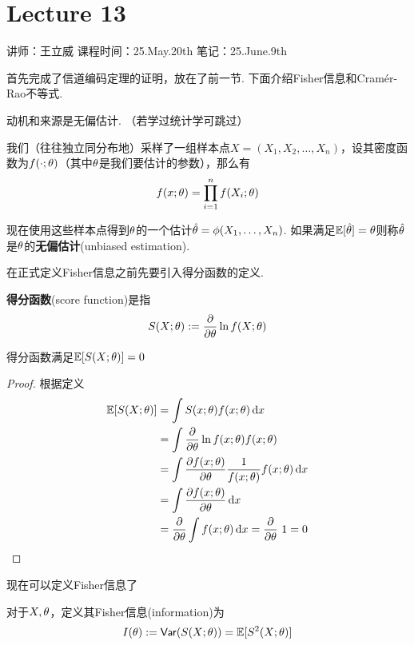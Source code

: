 \chapter{Lecture 13}

\begin{center}
    讲师：王立威 \qquad
    课程时间：25.May.20th \qquad 
    笔记：25.June.9th
\end{center}

\bigskip

首先完成了信道编码定理的证明，放在了前一节. 下面介绍Fisher信息和Cram​​ér-Rao不等式. 

动机和来源是无偏估计. （若学过统计学可跳过）
\begin{definition}[无偏估计]
    我们（往往独立同分布地）采样了一组样本点$X=(X_1,X_2,\dots, X_n)$，设其密度函数为$f(\cdot;\theta)$（其中$\theta$是我们要估计的参数），那么有 
    \[
    f(x;\theta) = \prod_{i=1}^n f(X_i; \theta)
    \]
    
    现在使用这些样本点得到$\theta$的一个估计$\hat{\theta} = \phi(X_1,\dots, X_n)$. 如果满足$\mathbb{E}[\hat{\theta}] = \theta$则称$\hat{\theta}$是$\theta$的\textbf{无偏估计}(unbiased estimation).
\end{definition} 

在正式定义Fisher信息之前先要引入得分函数的定义. 
\begin{definition}[得分函数]
    \textbf{得分函数}(score function)是指 
    \[
    S(X;\theta) := \dfrac{\partial}{\partial\theta} \ln f(X;\theta)
    \]
\end{definition}

\begin{proposition}
    得分函数满足$\mathbb{E}[S(X;\theta)] = 0$
\end{proposition}
\begin{proof}
    根据定义 
    \begin{align*}
        \mathbb{E}[S(X;\theta)] & = \int S(x;\theta) f(x;\theta) \mathop{}\!\mathrm{d}x \\
        & = \int \dfrac{\partial}{\partial\theta} \ln f(x;\theta) f(x;\theta) \\
        & = \int \dfrac{\partial f(x;\theta)}{\partial\theta} \dfrac{1}{f(x;\theta)} f(x;\theta) \mathop{}\!\mathrm{d}x \\ 
        & = \int \dfrac{\partial f(x;\theta)}{\partial\theta} \mathop{}\!\mathrm{d}x \\
        & = \dfrac{\partial}{\partial\theta}\int f(x;\theta) \mathop{}\!\mathrm{d}x = \dfrac{\partial}{\partial\theta} \ 1 = 0
    \end{align*}
\end{proof} 

现在可以定义Fisher信息了
\begin{definition}[Fisher信息]
    对于$X,\theta$，定义其Fisher信息(information)为 
    \[
    I(\theta) := \mathsf{Var}(S(X;\theta)) = \mathbb{E}[S^2(X;\theta)]
    \]
\end{definition}

